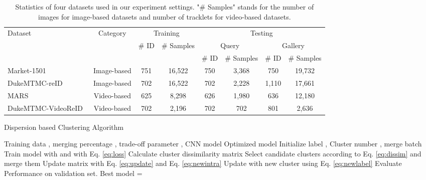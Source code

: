 \documentclass[journal]{IEEEtran}
\begin{document}
\begin{table*}[htb]
\caption{Statistics of four datasets used in our experiment settings. "\# Samples" stands for the number of images for image-based datasets and number of tracklets for video-based datasets.}
\begin{center}
\begin{tabular}{l|c|cc|cc|cc}
\hline
\multirow{3}{*}{Dataset} &\multirow{3}{*}{Category} & \multicolumn{2}{c|}{Training} & \multicolumn{4}{c}{Testing} \\\cline{3-8}
 & & \multirow{2}{*}{\# ID} & \multirow{2}{*}{\# Samples} & \multicolumn{2}{c|}{Query} & \multicolumn{2}{c}{Gallery} \\\cline{5-8}
 & & &  & \# ID & \# Samples & \# ID & \# Samples \\\hline
Market-1501~\cite{zheng2015scalable} & Image-based &751 & 16,522 & 750 & 3,368 & 750 & 19,732 \\
DukeMTMC-reID~\cite{zheng2017unlabeled} & Image-based  & 702 & 16,522 & 702 & 2,228 & 1,110 & 17,661 \\
MARS~\cite{zheng2016mars} & Video-based & 625 & 8,298 & 626 & 1,980 & 636 & 12,180 \\
DukeMTMC-VideoReID~\cite{wu2019progressive} & Video-based & 702 & 2,196 & 702 & 702 & 801 & 2,636 \\
\hline
\end{tabular}
\label{tab:datasets}
\end{center}
\end{table*} \begin{algorithm}[t]
   \caption{Dispersion based Clustering Algorithm}
   \label{alg:cud}
\begin{algorithmic}
    Training data , merging percentage , trade-off parameter , CNN model 
    Optimized model 
   \STATE Initialize label , Cluster number , merge batch 
   \WHILE{}
   \STATE Train model with  and  with Eq. \eqref{eq:loss}
   \STATE Calculate cluster dissimilarity matrix 
   \STATE Select candidate clusters according to Eq. \eqref{eq:dissim} and merge them  
   \STATE Update matrix  with Eq. \eqref{eq:update} and Eq. \eqref{eq:newintra}
   \STATE 
   \ENDFOR
   \STATE Update  with new cluster  using Eq. \eqref{eq:newlabel}
   \STATE Evaluate Performance  on validation set.
   \IF{}
   \STATE 
   \STATE Best model = 
   \ENDIF
   \ENDWHILE
\end{algorithmic}
\end{algorithm} 
\end{document}
